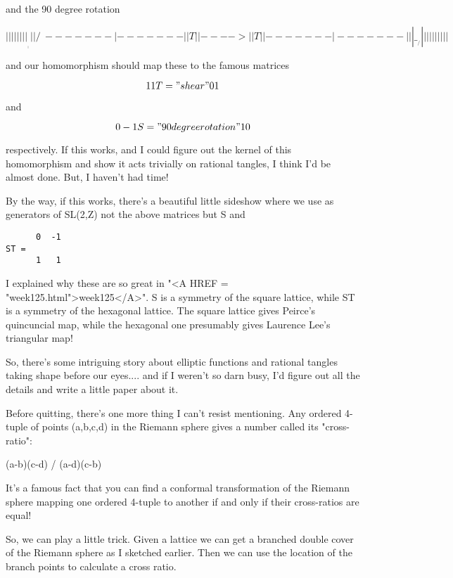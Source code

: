 and the 90 degree rotation

$$
  |   |             |     |     
  |   |             |     |    ____
  |   |             |     |   /    \
 -------            |    -------    |
 |  T  |   |---->   |    |  T  |    |    
 -------            |    -------    |
  |   |              \___/   |      |
  |   |                      |      |
  |   |                      |      |
   
$$
    
and our homomorphism should map these to the famous matrices

$$
      1   1             
T  =                    "shear"
      0   1
$$
    
and 

$$
      0  -1          
S =                   "90 degree rotation"
      1   0
$$
    
respectively.   If this works, and I could figure out the kernel of 
this homomorphism and show it acts trivially on rational tangles, 
I think I'd be almost done.  But, I haven't had time!

By the way, if this works, there's a beautiful little sideshow where 
we use as generators of SL(2,Z) not the above matrices but S and 

\begin{verbatim}
      0  -1
ST = 
      1   1
\end{verbatim}
    

I explained why these are so great in "<A HREF = "week125.html">week125</A>".  S is a symmetry of
the square lattice, while ST is a symmetry of the hexagonal lattice.
The square lattice gives Peirce's quincuncial map, while the hexagonal
one presumably gives Laurence Lee's triangular map!

So, there's some intriguing story about elliptic functions and rational
tangles taking shape before our eyes.... and if I weren't so darn busy,
I'd figure out all the details and write a little paper about it. 

Before quitting, there's one more thing I can't resist mentioning.
Any ordered 4-tuple of points (a,b,c,d) in the Riemann sphere gives 
a number called its "cross-ratio":

(a-b)(c-d) / (a-d)(c-b)

It's a famous fact that you can find a conformal transformation of
the Riemann sphere mapping one ordered 4-tuple to another if and 
only if their cross-ratios are equal!  

So, we can play a little trick.   Given a lattice we can get a 
branched double cover of the Riemann sphere as I sketched earlier.
Then we can use the location of the branch points to calculate a cross 
ratio.  

